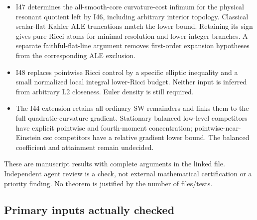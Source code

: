 \documentclass[
  10pt,
]{article}
\providecommand{\tightlist}{%
  \setlength{\itemsep}{0pt}\setlength{\parskip}{0pt}}
\begin{document}
\begin{itemize}
\tightlist
\item
  I47 determines the all-smooth-core curvature-cost infimum for the
  physical resonant quotient left by I46, including arbitrary interior
  topology. Classical scalar-flat Kahler ALE truncations match the lower
  bound. Retaining its sign gives pure-Ricci atoms for
  minimal-resolution and lower-integer branches. A separate
  faithful-flat-line argument removes first-order expansion hypotheses
  from the corresponding ALE exclusion.
\item
  I48 replaces pointwise Ricci control by a specific elliptic inequality
  and a small normalized local integral lower-Ricci budget. Neither
  input is inferred from arbitrary L2 closeness. Euler density is still
  required.
\item
  The I44 extension retains all ordinary-SW remainders and links them to
  the full quadratic-curvature gradient. Stationary balanced low-level
  competitors have explicit pointwise and fourth-moment concentration;
  pointwise-near-Einstein csc competitors have a relative gradient lower
  bound. The balanced coefficient and attainment remain undecided.
\end{itemize}

These are manuscript results with complete arguments in the linked file.
Independent agent review is a check, not external mathematical
certification or a priority finding. No theorem is justified by the
number of files/tests.

\hypertarget{primary-inputs-actually-checked}{%
\subsection{Primary inputs actually
checked}\label{primary-inputs-actually-checked}}
\end{document}
